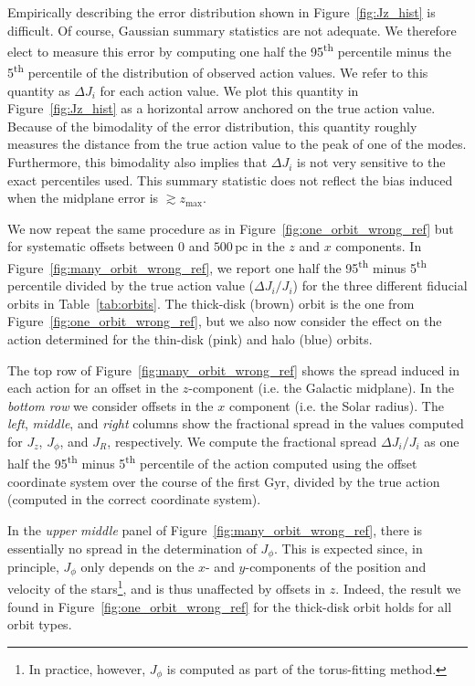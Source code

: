 \documentclass[twocolumn]{aastex62}
\newcommand{\pc}{\text{pc}}
\newcommand{\Gyr}{\text{Gyr}}
\newcommand{\uth}{\textsuperscript{th}}
\newcommand{\thincolor}{pink}
\newcommand{\thickcolor}{brown}
\newcommand{\halocolor}{blue}
\begin{document}
Empirically describing the error distribution shown in
Figure~\ref{fig:Jz_hist} is difficult. Of course, Gaussian summary statistics
are not adequate. We therefore elect to measure this error by computing one
half the 95\uth{} percentile minus the 5\uth{} percentile of the distribution
of observed action values. We refer to this quantity as $\Delta J_i$ for each
action value. We plot this quantity in Figure~\ref{fig:Jz_hist} as a
horizontal arrow anchored on the true action value. Because of the bimodality
of the error distribution, this quantity roughly measures the distance from
the true action value to the peak of one of the modes. Furthermore, this
bimodality also implies that $\Delta J_i$ is not very sensitive to the exact
percentiles used. This summary statistic does not reflect the bias induced
when the midplane error is $\gtrsim z_{\text{max}}$.

We now repeat the same procedure as in Figure~\ref{fig:one_orbit_wrong_ref}
but for systematic offsets between $0$ and $500\,\pc$ in the $z$ and $x$
components. In Figure~\ref{fig:many_orbit_wrong_ref}, we report one half the
95\uth{} minus 5\uth{} percentile divided by the true action value ($\Delta
J_i/J_i$) for the three different fiducial orbits in Table~\ref{tab:orbits}.
The thick-disk (\thickcolor) orbit is the one from
Figure~\ref{fig:one_orbit_wrong_ref}, but we also now consider the effect on
the action determined for the thin-disk (\thincolor) and halo (\halocolor)
orbits.

The top row of Figure~\ref{fig:many_orbit_wrong_ref} shows the spread induced
in each action for an offset in the $z$-component (i.e. the Galactic
midplane). In the {\em bottom row} we consider offsets in the $x$ component
(i.e. the Solar radius). The {\em left}, {\em middle}, and {\em right} columns
show the fractional spread in the values computed for $J_z$, $J_{\phi}$, and $J_R$,
respectively. We compute the fractional spread $\Delta J_i/J_i$ as one half
the 95\uth{} minus 5\uth{} percentile of the action computed using the offset
coordinate system over the course of the first $\Gyr$, divided by the true
action (computed in the correct coordinate system).

In the {\em upper middle} panel of Figure~\ref{fig:many_orbit_wrong_ref},
there is essentially no spread in the determination of $J_{\phi}$. This is expected
since, in principle, $J_{\phi}$ only depends on the $x$- and $y$-components of the
position and velocity of the stars\footnote{In practice, however, $J_{\phi}$ is
computed as part of the torus-fitting method.}, and is thus unaffected by
offsets in $z$. Indeed, the result we found in
Figure~\ref{fig:one_orbit_wrong_ref} for the thick-disk orbit holds for all
orbit types.
 
\end{document}
